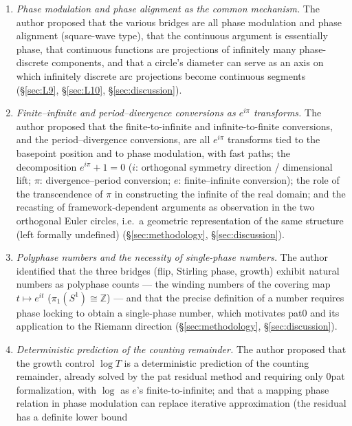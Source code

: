 \documentclass{article}
\newcommand{\Z}{\mathbb{Z}}
\begin{document}
\begin{enumerate}
trigonometric functions and continuing by cumulative values --- a Fourier
phase calibration --- and observed the equivalence of the count with the
lifted integer, and of the lifted integer with the Riemann hypothesis itself
(\S\ref{sec:L10}, \S\ref{sec:L12}).
\item \emph{Phase modulation and phase alignment as the common mechanism.}
The author proposed that the various bridges are all phase modulation and
phase alignment (square-wave type), that the continuous argument is
essentially phase, that continuous functions are projections of infinitely
many phase-discrete components, and that a circle's diameter can serve as an
axis on which infinitely discrete arc projections become continuous segments
(\S\ref{sec:L9}, \S\ref{sec:L10}, \S\ref{sec:discussion}).
\item \emph{Finite--infinite and period--divergence conversions as $e^{i\pi}$
transforms.} The author proposed that the finite-to-infinite and
infinite-to-finite conversions, and the period--divergence conversions, are
all $e^{i\pi}$ transforms tied to the basepoint position and to phase
modulation, with fast paths; the decomposition $e^{i\pi}+1=0$ ($i$:
orthogonal symmetry direction / dimensional lift; $\pi$:
divergence--period conversion; $e$: finite--infinite conversion); the role
of the transcendence of $\pi$ in constructing the infinite of the real
domain; and the recasting of framework-dependent arguments as observation in
the two orthogonal Euler circles, i.e.\ a geometric representation of the
same structure (left formally undefined) (\S\ref{sec:methodology},
\S\ref{sec:discussion}).
\item \emph{Polyphase numbers and the necessity of single-phase numbers.}
The author identified that the three bridges (flip, Stirling phase, growth)
exhibit natural numbers as polyphase counts --- the winding numbers of the
covering map $t\mapsto e^{it}$ ($\pi_1(S^1)\cong\Z$) --- and that the
precise definition of a number requires phase locking to obtain a
single-phase number, which motivates pat0 and its application to the Riemann
direction (\S\ref{sec:methodology}, \S\ref{sec:discussion}).
\item \emph{Deterministic prediction of the counting remainder.} The author
proposed that the growth control $\log T$ is a deterministic prediction of
the counting remainder, already solved by the pat residual method and
requiring only 0pat formalization, with $\log$ as $e$'s
finite-to-infinite; and that a mapping phase relation in phase modulation
can replace iterative approximation (the residual has a definite lower bound

\end{enumerate}
\end{document}
